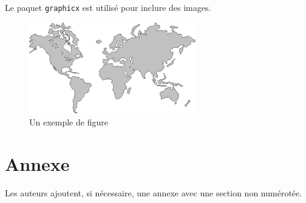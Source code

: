 \documentclass{jres}
\begin{document}
Le paquet \texttt{graphicx} est utilisé pour inclure des images.

\begin{figure}
\centerline{\includegraphics[height=4cm]{figure}}
\caption{Un exemple de figure}
\label{fig-exemple}
\end{figure}

\section*{Annexe}

Les auteurs ajoutent, si nécessaire, une annexe avec une section non numérotée.

\nocite{*}

\end{document}
